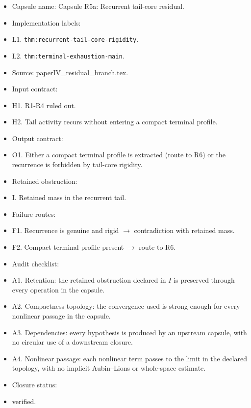 \documentclass[11pt]{amsart}
\begin{document}
\begin{itemize}
  \item Capsule name: Capsule R5a: Recurrent tail-core residual.
  \item Implementation labels:
  \item L1. \texttt{thm:recurrent-tail-core-rigidity}.
  \item L2. \texttt{thm:terminal-exhaustion-main}.
  \item Source: paperIV\_residual\_branch.tex.
  \item Input contract:
  \item H1. R1-R4 ruled out.
  \item H2. Tail activity recurs without entering a compact terminal profile.
  \item Output contract:
  \item O1. Either a compact terminal profile is extracted (route to R6) or the recurrence is forbidden by tail-core rigidity.
  \item Retained obstruction:
  \item I. Retained mass in the recurrent tail.
  \item Failure routes:
  \item F1. Recurrence is genuine and rigid $\to$ contradiction with retained mass.
  \item F2. Compact terminal profile present $\to$ route to R6.
  \item Audit checklist:
  \item A1. Retention: the retained obstruction declared in $I$ is preserved through every operation in the capsule.
  \item A2. Compactness topology: the convergence used is strong enough for every nonlinear passage in the capsule.
  \item A3. Dependencies: every hypothesis is produced by an upstream capsule, with no circular use of a downstream closure.
  \item A4. Nonlinear passage: each nonlinear term passes to the limit in the declared topology, with no implicit Aubin--Lions or whole-space estimate.
  \item Closure status:
  \item verified.
\end{itemize}
\end{document}
